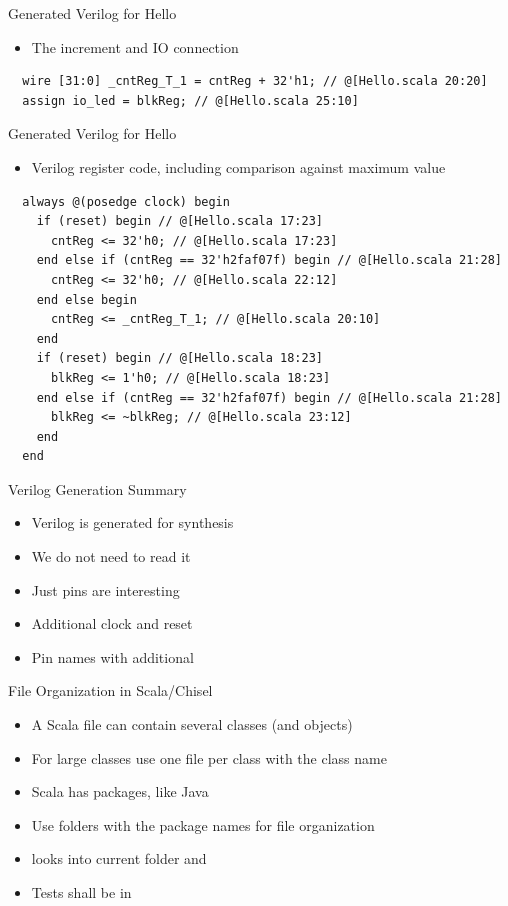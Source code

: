 \begin{frame}[fragile]{Generated Verilog for Hello}
\begin{itemize}
\item The increment and IO connection
\end{itemize}
\begin{verbatim}
  wire [31:0] _cntReg_T_1 = cntReg + 32'h1; // @[Hello.scala 20:20]
  assign io_led = blkReg; // @[Hello.scala 25:10]
\end{verbatim}
\end{frame}

\begin{frame}[fragile]{Generated Verilog for Hello}
\begin{itemize}
\item Verilog register code, including comparison against maximum value
\end{itemize}
\begin{verbatim}
  always @(posedge clock) begin
    if (reset) begin // @[Hello.scala 17:23]
      cntReg <= 32'h0; // @[Hello.scala 17:23]
    end else if (cntReg == 32'h2faf07f) begin // @[Hello.scala 21:28]
      cntReg <= 32'h0; // @[Hello.scala 22:12]
    end else begin
      cntReg <= _cntReg_T_1; // @[Hello.scala 20:10]
    end
    if (reset) begin // @[Hello.scala 18:23]
      blkReg <= 1'h0; // @[Hello.scala 18:23]
    end else if (cntReg == 32'h2faf07f) begin // @[Hello.scala 21:28]
      blkReg <= ~blkReg; // @[Hello.scala 23:12]
    end
  end
\end{verbatim}
\end{frame}

\begin{frame}[fragile]{Verilog Generation Summary}
\begin{itemize}
\item Verilog is generated for synthesis
\item We do not need to read it
\item Just pins are interesting
\item Additional clock and reset
\item Pin names with additional 
\end{itemize}
\end{frame}

\begin{frame}[fragile]{File Organization in Scala/Chisel}
\begin{itemize}
\item A Scala file can contain several classes (and objects)
\item For large classes use one file per class with the class name
\item Scala has packages, like Java
\item Use folders with the package names for file organization
\item {} looks into current folder and 
\item Tests shall be in 
\end{itemize}
\end{frame}

